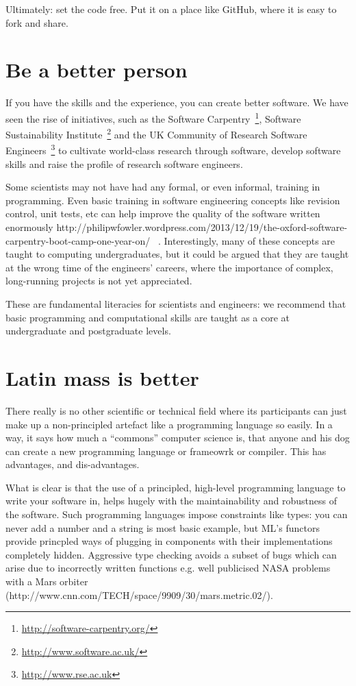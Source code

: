 \documentclass[conference]{IEEEtran}
\begin{document}
Ultimately: set the code free. Put it on a place like GitHub, where it
is easy to fork and share.


\section{Be a better person}

If you have the skills and the experience, you can create better
software. We have seen the rise of initiatives, such as the Software
Carpentry~\footnote{\url{http://software-carpentry.org/}}, Software
Sustainability Institute~\footnote{\url{http://www.software.ac.uk/}}
and the UK Community of Research Software
Engineers~\footnote{\url{http://www.rse.ac.uk}} to cultivate
world-class research through software, develop software skills and
raise the profile of research software engineers.

Some scientists may not have had any formal, or even informal,
training in programming. Even basic training in software engineering
concepts like revision control, unit tests, etc can help improve the
quality of the software written enormously
http://philipwfowler.wordpress.com/2013/12/19/the-oxford-software-carpentry-boot-camp-one-year-on/
~\cite{Wilson2014}.  Interestingly, many of these concepts are taught
to computing undergraduates, but it could be argued that they are
taught at the wrong time of the engineers' careers, where the
importance of complex, long-running projects is not yet appreciated.

These are fundamental literacies for scientists and engineers: we
recommend that basic programming and computational skills are taught
as a core at undergraduate and postgraduate levels.


\section{Latin mass is better}

There really is no other scientific or technical field where its
participants can just make up a non-principled artefact like a
programming language so easily. In a way, it says how much a
``commons'' computer science is, that anyone and his dog can create a
new programming language or frameowrk or compiler. This has
advantages, and dis-advantages.

What is clear is that the use of a principled, high-level programming
language to write your software in, helps hugely with the
maintainability and robustness of the software. Such programming
languages impose constraints like types: you can never add a number
and a string is most basic example, but ML's functors provide
princpled ways of plugging in components with their implementations
completely hidden. Aggressive type checking avoids a subset of bugs
which can arise due to incorrectly written functions e.g. well
publicised NASA problems with a Mars orbiter
(http://www.cnn.com/TECH/space/9909/30/mars.metric.02/).
\end{document}
